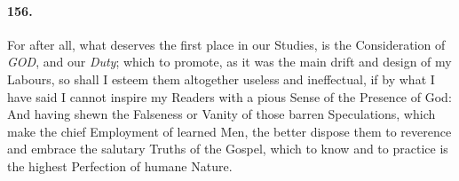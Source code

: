 \documentclass[]{article}
\newenvironment{sectionbody}{\begin{multicols}{2}}{\end{multicols}}
\begin{document}
\begin{sectionbody}
\paragraph{156.} For after all, what deserves the first place in our Studies, is
the Consideration of \emph{GOD}, and our \emph{Duty}; which to
promote, as it was the main drift and design of my Labours, so
shall I esteem them altogether useless and ineffectual, if by
what I have said I cannot inspire my Readers with a pious Sense
of the Presence of {\sc God}: And having shewn the Falseness or
Vanity of those barren Speculations, which make the chief
Employment of learned Men, the better dispose them to reverence
and embrace the salutary Truths of the {\sc Gospel}, which to
know and to practice is the highest Perfection of humane Nature.

\end{sectionbody}
\end{document}
